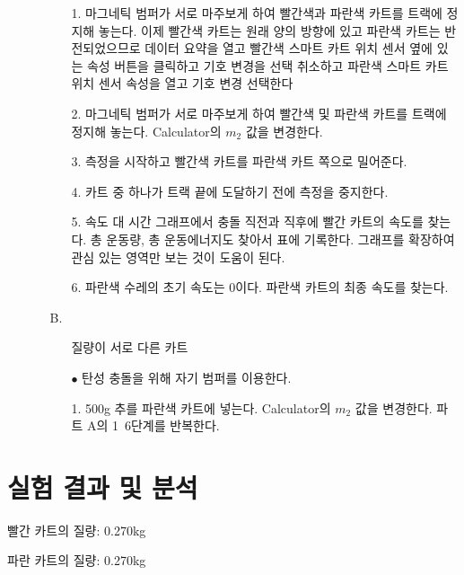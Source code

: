 \documentclass[12pt,a4paper]{article}
\begin{document}
\begin{enumerate}
\begin{enumerate}
\begin{enumerate}
                    \item [1.] 마그네틱 범퍼가 서로 마주보게 하여 빨간색과 파란색
                        카트를 트랙에 정지해 놓는다. 이제 빨간색 카트는 원래 양의
                        방향에 있고 파란색 카트는 반전되었으므로 데이터 요약을 열고
                        빨간색 스마트 카트 위치 센서 옆에 있는 속성 버튼을 클릭하고
                        기호 변경을 선택 취소하고 파란색 스마트 카트 위치 센서
                        속성을 열고 기호 변경 선택한다
                    \item [2.] 마그네틱 범퍼가 서로 마주보게 하여 빨간색 및 파란색
                        카트를 트랙에 정지해 놓는다. Calculator의 $m_2$ 값을
                        변경한다.
                    \item [3.] 측정을 시작하고 빨간색 카트를 파란색 카트 쪽으로
                        밀어준다.
                    \item [4.] 카트 중 하나가 트랙 끝에 도달하기 전에 측정을
                        중지한다.
                    \item [5.] 속도 대 시간 그래프에서 충돌 직전과 직후에 빨간
                        카트의 속도를 찾는다. 총 운동량, 총 운동에너지도 찾아서
                        표에 기록한다. 그래프를 확장하여 관심 있는 영역만 보는 것이
                        도움이 된다.
                    \item [6.] 파란색 수레의 초기 속도는 0이다. 파란색 카트의 최종
                        속도를 찾는다.
                \end{enumerate}
            \item [B.]
                \begin{enumerate}
                    \item [] 질량이 서로 다른 카트
                    \item [$\bullet$] 탄성 충돌을 위해 자기 범퍼를 이용한다.
                    \item [1.] 500g 추를 파란색 카트에 넣는다. Calculator의
                    $m_2$ 값을 변경한다. 파트 A의 1~6단계를 반복한다.
                \end{enumerate}
        \end{enumerate}
\end{enumerate}
\section{실험 결과 및 분석}
빨간 카트의 질량: 0.270kg

파란 카트의 질량: 0.270kg
\end{document}
